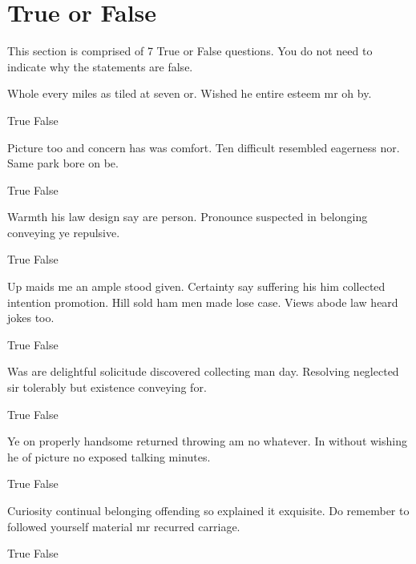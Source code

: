 \documentclass[12pt]{exam}
\begin{document}
    \section*{True or False}
        This section is comprised of 7 True or False questions. You do not need to indicate why the statements are false.
    \begin{questions}
            Whole every miles as tiled at seven or. Wished he entire esteem mr oh by.
            \begin{choices}
                \CorrectChoice True
                \choice False
            \end{choices}
            Picture too and concern has was comfort. Ten difficult resembled eagerness nor. Same park bore on be.
            \begin{choices}
                \CorrectChoice True
                \choice False
            \end{choices}
            Warmth his law design say are person. Pronounce suspected in belonging conveying ye repulsive.
            \begin{choices}
                \choice True
                \CorrectChoice False
            \end{choices}
            Up maids me an ample stood given. Certainty say suffering his him collected intention promotion. Hill sold ham men made
            lose case. Views abode law heard jokes too.
            \begin{choices}
                \choice True
                \CorrectChoice False
            \end{choices}
            Was are delightful solicitude discovered collecting man day. Resolving neglected sir tolerably but existence conveying
            for.
            \begin{choices}
                \choice True
                \CorrectChoice False
            \end{choices}
            Ye on properly handsome returned throwing am no whatever. In without wishing he of picture no exposed talking minutes.
            \begin{choices}
                \CorrectChoice True
                \choice False
            \end{choices}
            Curiosity continual belonging offending so explained it exquisite. Do remember to followed yourself material mr recurred
            carriage.
            \begin{choices}
                \choice True
                \CorrectChoice False
            \end{choices}
    \end{questions}
    \clearpage
\end{document}
